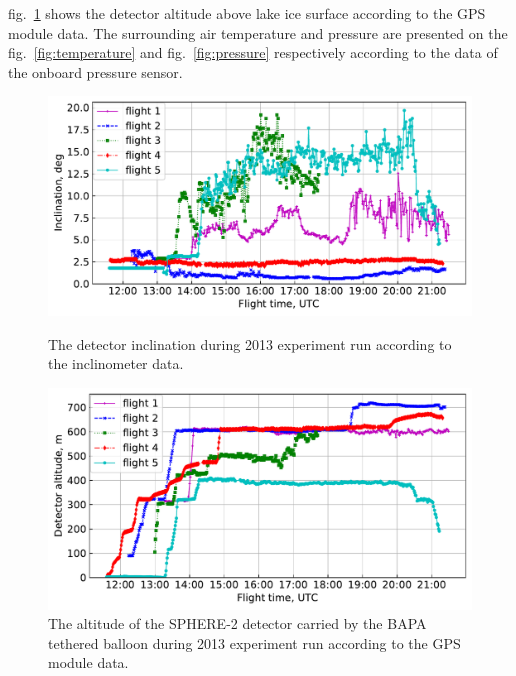 \documentclass[final,5p,times,twocolumn]{elsarticle}
\begin{document}
fig.~\ref{fig:height} shows the detector altitude above lake ice surface according to the GPS module data. The surrounding air temperature and pressure are presented on the fig.~\ref{fig:temperature} and fig.~\ref{fig:pressure} respectively according to the data of the onboard pressure sensor.

\begin{figure}[tb]
    \begin{minipage}[t]{0.48\textwidth}
    \centering
    \includegraphics[width=\textwidth]{figs/ClinTh.pdf}
    \caption{The detector inclination during 2013 experiment run according to the inclinometer data.}
    \label{fig:inclination} 
    \end{minipage}
    \hfill
    \begin{minipage}[t]{0.48\textwidth}
    \centering
    \includegraphics[width=\textwidth]{figs/height.pdf}
    \caption{The altitude of the SPHERE-2 detector carried by the BAPA tethered balloon during 2013 experiment run according to the GPS module data.}
    \label{fig:height}
    \end{minipage}

  \vspace{1.5pc}


\end{figure}
\end{document}

